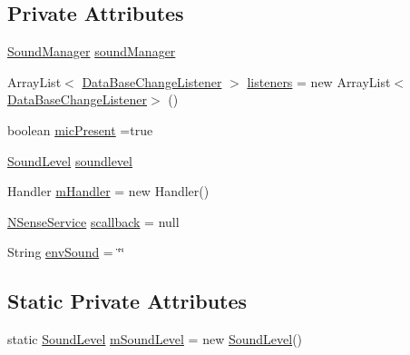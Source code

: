 \subsection*{Private Attributes}
\begin{DoxyCompactItemize}
\item 
\hyperlink{classcs_1_1nsense_1_1microphone_1_1_sound_manager}{Sound\-Manager} \hyperlink{classcs_1_1nsense_1_1microphone_1_1_microphone_pipeline_a60aecbf21d53efec2168b78b945eaca1}{sound\-Manager}
\item 
Array\-List$<$ \hyperlink{interfacecs_1_1nsense_1_1db_1_1_data_base_change_listener}{Data\-Base\-Change\-Listener} $>$ \hyperlink{classcs_1_1nsense_1_1microphone_1_1_microphone_pipeline_a803c737599414c167d0e32fe9b74e08e}{listeners} = new Array\-List$<$\hyperlink{interfacecs_1_1nsense_1_1db_1_1_data_base_change_listener}{Data\-Base\-Change\-Listener}$>$ ()
\item 
boolean \hyperlink{classcs_1_1nsense_1_1microphone_1_1_microphone_pipeline_ae65a18cc5a3690fa0eba3b32409610b1}{mic\-Present} =true
\item 
\hyperlink{classcs_1_1nsense_1_1microphone_1_1_sound_level}{Sound\-Level} \hyperlink{classcs_1_1nsense_1_1microphone_1_1_microphone_pipeline_ab1333d6f5735373cbacef07ca8d7a775}{soundlevel}
\item 
Handler \hyperlink{classcs_1_1nsense_1_1microphone_1_1_microphone_pipeline_a6485be60175a2b783a508711d6e5414a}{m\-Handler} = new Handler()
\item 
\hyperlink{classcs_1_1nsense_1_1_n_sense_service}{N\-Sense\-Service} \hyperlink{classcs_1_1nsense_1_1microphone_1_1_microphone_pipeline_a9b4ae85f6ec3eae60e6bf9487e4f273a}{scallback} = null
\item 
String \hyperlink{classcs_1_1nsense_1_1microphone_1_1_microphone_pipeline_adc2543723923db8f92bce32562db8439}{env\-Sound} = \char`\"{}\char`\"{}
\end{DoxyCompactItemize}
\subsection*{Static Private Attributes}
\begin{DoxyCompactItemize}
\item 
static \hyperlink{classcs_1_1nsense_1_1microphone_1_1_sound_level}{Sound\-Level} \hyperlink{classcs_1_1nsense_1_1microphone_1_1_microphone_pipeline_a34eddb30f49a7969352214be554d413a}{m\-Sound\-Level} = new \hyperlink{classcs_1_1nsense_1_1microphone_1_1_sound_level}{Sound\-Level}()
\end{DoxyCompactItemize}


